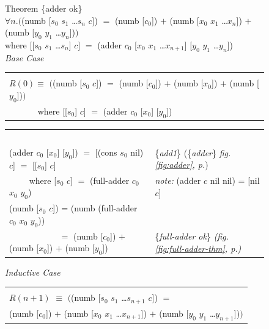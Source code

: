 \begin{figure}
Theorem \{adder ok\}\\
$\forall n.($\textsf{(numb [$s_0$ $s_1$ \dots $s_{n}$ $c$])} $=$
\textsf{(numb [$c_0$])} $+$ \textsf{(numb [$x_0$ $x_1$ \dots $x_{n}$])} $+$ \textsf{(numb [$y_0$ $y_1$ \dots $y_{n}$])}$)$\\
\hphantom{(numb}where \textsf{[[$s_0$ $s_1$ \dots $s_{n}$] $c$]} $=$ \textsf{(adder $c_0$ [$x_0$ $x_1$ \dots $x_{n+1}$] [$y_0$ $y_1$ \dots $y_{n}$])}
~\\[1mm]
\emph{Base Case}
\begin{center}
\begin{tabular}{l}
\hline\\[-1.0em]
$R(0) \equiv$  $($\textsf{(numb [$s_0$ $c$])} $=$ \textsf{(numb [$c_0$])} $+$ \textsf{(numb [$x_0$])} $+$ \textsf{(numb [$y_0$])}$)$ \\
 ~~~~~~ where \textsf{[[$s_0$] $c$]} $=$ \textsf{(adder $c_0$ [$x_0$] [$y_0$])}
\\[2pt]
\hline
\end{tabular}
\begin{tabular}{ll}~\\[-1.0em]
\textsf{(adder $c_0$ [$x_0$] [$y_0$])} $=$ \textsf{[(cons $s_0$ nil) $c$]} $=$ \textsf{[[$s_0$] $c$]} & \{\emph{add1}\} (\{\emph{adder}\} \emph{fig. \ref{fig:adder}, p.\pageref{fig:adder}}) \\
~~~~ where \textsf{[$s_0$ $c$]} $=$ \textsf{(full-adder $c_0$ $x_0$ $y_0$)}          & \emph{note:} \textsf{(adder} $c$ \textsf{nil nil)} = \textsf{[}\textsf{nil} $c$\textsf{]} \\
\textsf{(numb [$s_0$ $c$])} = \textsf{(numb (full-adder $c_0$ $x_0$ $y_0$))}          &  \\
~~~~~~~~~~~ $=$ \textsf{(numb [$c_0$])} $+$ \textsf{(numb [$x_0$])} $+$ \textsf{(numb [$y_0$])}  & \{\emph{full-adder ok}\} \emph{(fig. \ref{fig:full-adder-thm}, p.\pageref{fig:full-adder-thm})}\\
\end{tabular}
\end{center}
\emph{Inductive Case}
\begin{center}
\begin{tabular}{l}
\hline\\[-1.0em]
$R(n+1)$ $\equiv$ $($\textsf{(numb [$s_0$ $s_1$ \dots $s_{n+1}$ $c$])} $=$ \\
\hphantom{$R(n+1)$ $\equiv$ $($}\textsf{(numb [$c_0$])} $+$ \textsf{(numb [$x_0$ $x_1$ \dots $x_{n+1}$])} $+$ \textsf{(numb [$y_0$ $y_1$ \dots $y_{n+1}$])}$)$ \\

\end{tabular}
\end{center}
\end{figure}

